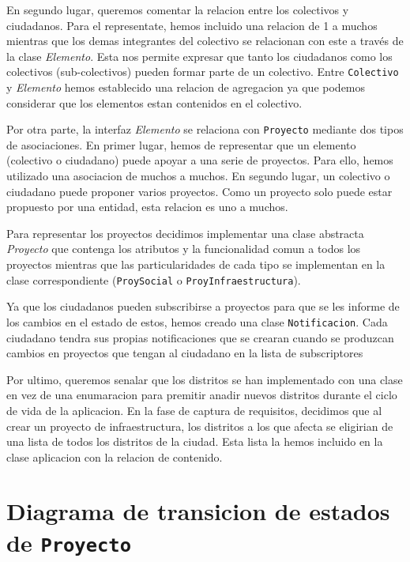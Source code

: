 \documentclass[12pt]{article}
\begin{document}
\par
En segundo lugar, queremos comentar la relacion entre los colectivos y ciudadanos. Para el representate, hemos incluido una relacion de 1 a muchos mientras que los demas integrantes del colectivo se relacionan con este a través de la clase \textit{Elemento}. Esta nos permite expresar que tanto los ciudadanos como los colectivos (sub-colectivos) pueden formar parte de un colectivo. Entre \texttt{Colectivo} y \textit{Elemento} hemos establecido una relacion de agregacion ya que podemos considerar que los elementos estan contenidos en el colectivo.
\par
Por otra parte, la interfaz \textit{Elemento} se relaciona con \texttt{Proyecto} mediante dos tipos de asociaciones. En primer lugar, hemos de representar que un elemento (colectivo o ciudadano) puede apoyar a una serie de proyectos. Para ello, hemos utilizado una asociacion de muchos a muchos.
En segundo lugar, un colectivo o ciudadano puede proponer varios proyectos. Como un proyecto solo puede estar propuesto por una entidad, esta relacion es uno a muchos. 
\par 

Para representar los proyectos decidimos implementar una clase abstracta \textit{Proyecto} que contenga los atributos y la funcionalidad comun a todos los proyectos mientras que las particularidades de cada tipo se implementan en la clase correspondiente (\texttt{ProySocial} o \texttt{ProyInfraestructura}).
\par
Ya que los ciudadanos pueden subscribirse a proyectos para que se les informe de los cambios en el estado de estos, hemos creado una clase \texttt{Notificacion}. Cada ciudadano tendra sus propias notificaciones que se crearan cuando se produzcan cambios en proyectos que tengan al ciudadano en la lista de subscriptores

\par Por ultimo, queremos senalar que los distritos se han implementado con una clase en vez de una enumaracion para premitir anadir nuevos distritos durante el ciclo de vida de la aplicacion. En la fase de captura de requisitos, decidimos que al crear un proyecto de infraestructura, los distritos a los que afecta se eligirian de una lista de todos los distritos de la ciudad. Esta lista la hemos incluido en la clase aplicacion con la relacion de contenido.


\newpage
\section{Diagrama de transicion de estados de \texttt{Proyecto}}
\end{document}
